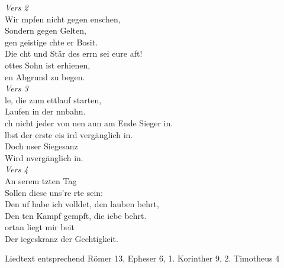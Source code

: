 \textit{Vers 2}\\
Wir mpfen nicht gegen enschen, \\
Sondern gegen Gelten,\\
gen geistige chte er Bosit.\\
Die cht und Stär des errn sei eure aft!\\
ottes Sohn ist erhienen, \\
en Abgrund zu begen.\\

\textit{Vers 3}\\
le, die zum ettlauf starten, \\
Laufen in der nnbahn.\\
ch nicht jeder von nen ann am Ende Sieger 
in.\\
lbst der erste eis ird vergänglich in.\\
Doch nser Siegesanz \\
Wird nvergänglich in.\\

\textit{Vers 4}\\
An serem tzten Tag\\
Sollen diese uns're rte sein:\\
Den uf habe ich volldet, den lauben behrt,\\
Den ten Kampf gempft, die iebe behrt.\\
ortan liegt mir beit\\
Der iegeskranz der Gechtigkeit.\\

\begin{footnotesize}
Liedtext entsprechend Römer 13, Epheser 6, 1. Korinther 9, 2. Timotheus 4
\end{footnotesize}